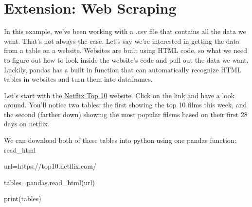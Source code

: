 \documentclass[
  letterpaper,
  DIV=11,
  numbers=noendperiod]{scrreprt}
\newenvironment{Shaded}{\begin{snugshade}}{\end{snugshade}}
\newcommand{\BuiltInTok}[1]{\textcolor[rgb]{0.00,0.23,0.31}{#1}}
\newcommand{\NormalTok}[1]{\textcolor[rgb]{0.00,0.23,0.31}{#1}}
\newcommand{\OperatorTok}[1]{\textcolor[rgb]{0.37,0.37,0.37}{#1}}
\newcommand{\StringTok}[1]{\textcolor[rgb]{0.13,0.47,0.30}{#1}}
\begin{document}

\hypertarget{extension-web-scraping}{%
\chapter{Extension: Web Scraping}\label{extension-web-scraping}}

In this example, we've been working with a .csv file that contains all
the data we want. That's not always the case. Let's say we're interested
in getting the data from a table on a website. Websites are built using
HTML code, so what we need to figure out how to look inside the
website's code and pull out the data we want. Luckily, pandas has a
built in function that can automatically recognize HTML tables in
websites and turn them into dataframes.

Let's start with the \href{https://top10.netflix.com/}{Netflix Top 10}
website. Click on the link and have a look around. You'll notice two
tables: the first showing the top 10 films this week, and the second
(farther down) showing the most popular filsms based on their first 28
days on netflix.

We can download both of these tables into python using one pandas
function: read\_html

\begin{Shaded}
\begin{Highlighting}[]
\NormalTok{url}\OperatorTok{=}\StringTok{\textquotesingle{}https://top10.netflix.com/\textquotesingle{}}

\NormalTok{tables}\OperatorTok{=}\NormalTok{pandas.read\_html(url)}

\BuiltInTok{print}\NormalTok{(tables)}
\end{Highlighting}
\end{Shaded}
\end{document}
